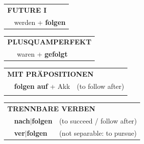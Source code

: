 \documentclass[10pt,a4paper]{revtex4-2}
\begin{document}
\begin{verbbox-dat}
\begin{tabular}{rl}
    \multicolumn{2}{l}{\textbf{FUTURE I} }\\
   & werden + \textbf{folgen}\\
 
  \end{tabular}
\hfill
   \begin{tabular}{rl}
      \multicolumn{2}{l}{\textbf{PLUSQUAMPERFEKT}}\\
   & waren + \textbf{gefolgt}\\
  \end{tabular}

   \vspace{10pt}

   \begin{tabular}{lll}
      \multicolumn{3}{l}{\textbf{MIT PRÄPOSITIONEN}}\\
& \textbf{folgen auf} + Akk & (to follow after)\\
\vspace{10pt}
\end{tabular}
  \hfill
   \begin{tabular}{lll}
      \multicolumn{3}{l}{\textbf{TRENNBARE VERBEN}}\\
 & \textbf{nach$|$folgen} & (to succeed / follow after)\\
 & \textbf{ver$|$folgen} & (not separable: to pursue)\\
  \end{tabular}


  \vspace{-5pt}


\end{verbbox-dat}
\end{document}
